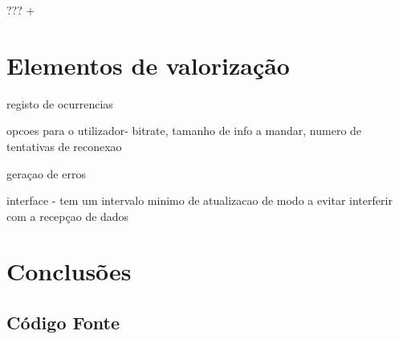 \documentclass[11pt,a4paper,reqno]{report}
\numberwithin{equation}{section}
\begin{document}
??? +

\chapter{Elementos de valorização}

registo de ocurrencias

opcoes para o utilizador-
bitrate,
tamanho de info a mandar,
numero de tentativas de reconexao

geraçao de erros

interface - tem um intervalo minimo de atualizacao de modo a evitar interferir com a recepçao de dados

\chapter{Conclusões}




\begin{appendices}

\chapter{Código Fonte}

\end{appendices}
\end{document}
